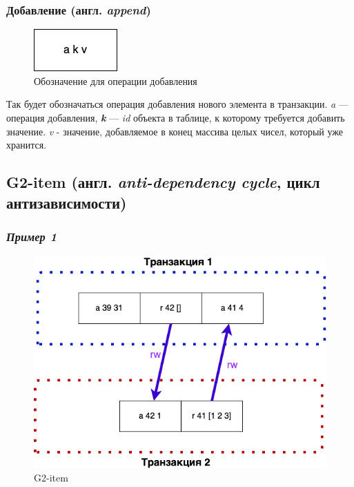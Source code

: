\documentclass[12pt,  openany]{book}
\begin{document}
\subsubsection{Добавление (англ. \textit{append})}
\begin{figure}[H]
\centering
  \includegraphics[scale=1.0]{images/append.png}
  \caption{Обозначение для операции добавления}
\end{figure}
Так будет обозначаться операция добавления нового элемента в транзакции. \textit{a} --- операция добавления, \textit{\textbf{k}} --- \textit{id} объекта в таблице,  к которому требуется добавить значение. \textit{v} - значение, добавляемое в конец массива целых чисел, который уже хранится.

\subsection{G2-item (англ. \textit{anti-dependency cycle}, цикл антизависимости)}
\subsubsection{\textit{Пример 1}}
\begin{figure}[H]
  \includegraphics[width=\textwidth]{images/g2item1.png}
  \caption{G2-item}
\end{figure}
\end{document}
